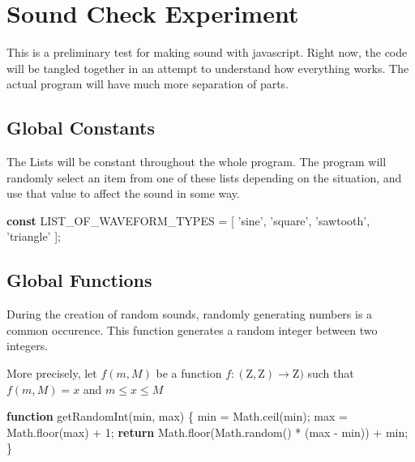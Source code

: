 \documentclass[]{article}
\date{}
\newenvironment{Shaded}{}{}
\newcommand{\KeywordTok}[1]{\textcolor[rgb]{0.00,0.44,0.13}{\textbf{#1}}}
\newcommand{\DecValTok}[1]{\textcolor[rgb]{0.25,0.63,0.44}{#1}}
\newcommand{\StringTok}[1]{\textcolor[rgb]{0.25,0.44,0.63}{#1}}
\newcommand{\VariableTok}[1]{\textcolor[rgb]{0.10,0.09,0.49}{#1}}
\newcommand{\ControlFlowTok}[1]{\textcolor[rgb]{0.00,0.44,0.13}{\textbf{#1}}}
\newcommand{\OperatorTok}[1]{\textcolor[rgb]{0.40,0.40,0.40}{#1}}
\newcommand{\AttributeTok}[1]{\textcolor[rgb]{0.49,0.56,0.16}{#1}}
\newcommand{\NormalTok}[1]{#1}
\begin{document}
\section{Sound Check Experiment}\label{sound-check-experiment}

This is a preliminary test for making sound with javascript. Right now,
the code will be tangled together in an attempt to understand how
everything works. The actual program will have much more separation of
parts.

\subsection{Global Constants}\label{global-constants}

The Lists will be constant throughout the whole program. The program
will randomly select an item from one of these lists depending on the
situation, and use that value to affect the sound in some way.

\begin{Shaded}
\begin{Highlighting}[]
\KeywordTok{const}\NormalTok{ LIST_OF_WAVEFORM_TYPES }\OperatorTok{=}\NormalTok{ [}
    \StringTok{'sine'}\OperatorTok{,} \StringTok{'square'}\OperatorTok{,} \StringTok{'sawtooth'}\OperatorTok{,} \StringTok{'triangle'}
\NormalTok{]}\OperatorTok{;}
\end{Highlighting}
\end{Shaded}

\subsection{Global Functions}\label{global-functions}

During the creation of random sounds, randomly generating numbers is a
common occurence. This function generates a random integer between two
integers.

More precisely, let \(f(m,M)\) be a function
\(f:(\mathrm{Z}, \mathrm{Z}) \to \mathrm{Z})\) such that \(f(m,M) = x\)
and \(m \leq x \leq M\)

\begin{Shaded}
\begin{Highlighting}[]
\KeywordTok{function} \AttributeTok{getRandomInt}\NormalTok{(min}\OperatorTok{,}\NormalTok{ max) }\OperatorTok{\{}
\NormalTok{    min }\OperatorTok{=} \VariableTok{Math}\NormalTok{.}\AttributeTok{ceil}\NormalTok{(min)}\OperatorTok{;}
\NormalTok{    max }\OperatorTok{=} \VariableTok{Math}\NormalTok{.}\AttributeTok{floor}\NormalTok{(max) }\OperatorTok{+} \DecValTok{1}\OperatorTok{;}
    \ControlFlowTok{return} \VariableTok{Math}\NormalTok{.}\AttributeTok{floor}\NormalTok{(}\VariableTok{Math}\NormalTok{.}\AttributeTok{random}\NormalTok{() }\OperatorTok{*}\NormalTok{ (max }\OperatorTok{-}\NormalTok{ min)) }\OperatorTok{+}\NormalTok{ min}\OperatorTok{;}
\OperatorTok{\}}
\end{Highlighting}
\end{Shaded}
\end{document}
